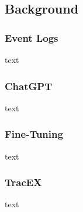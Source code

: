 \subsection{Background}\label{sec:back}
\subsubsection*{Event Logs}\label{sec:event-log}
text
\subsubsection*{ChatGPT}\label{sec:chatgpt}
text
\subsubsection*{Fine-Tuning}\label{sec:fine-tuning-def}
text
\subsubsection*{TracEX}\label{sec:tracex}
text
